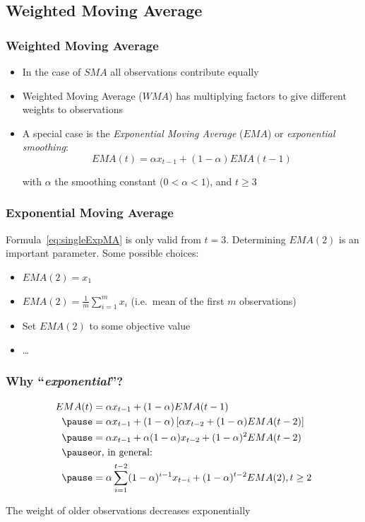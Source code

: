 \documentclass{beamer}
\begin{document}
\subsection{Weighted Moving Average}

\begin{frame}
  \frametitle{Weighted Moving Average}

  \begin{itemize}
    \item In the case of $SMA$ all observations contribute equally
    \item Weighted Moving Average ($WMA$) has multiplying factors to give different weights to observations
    \item A special case is the \emph{Exponential Moving Average} ($EMA$) or \emph{exponential smoothing}:
      \begin{equation}
        EMA(t) = \alpha x_{t-1} + (1-\alpha) EMA(t-1)
        \label{eq:singleExpMA}
      \end{equation}

      with $\alpha$ the smoothing constant ($0 < \alpha < 1$), and $t \geq 3$
  \end{itemize}
\end{frame}

\begin{frame}
  \frametitle{Exponential Moving Average}

  Formula~\ref{eq:singleExpMA} is only valid from $t=3$. Determining  $EMA(2)$ is an important parameter. Some possible choices:
  
  \begin{itemize}
    \item $EMA(2) = x_1$
    \item $EMA(2) = \frac{1}{m} \sum_{i=1}^{m} x_i$ (i.e.~mean of the first $m$ observations)
    \item Set $EMA(2)$ to some objective value
    \item \ldots
  \end{itemize}
\end{frame}

\begin{frame}
  \frametitle{Why ``\emph{exponential}''?}

  \begin{align*}
    EMA(t) & = \alpha x_{t-1} + (1-\alpha) EMA(t-1)                                           \\ \pause
           & = \alpha x_{t-1} + (1-\alpha)\left[\alpha x_{t-2} + (1-\alpha)EMA(t - 2)\right]  \\ \pause
           & = \alpha x_{t-1} + \alpha (1-\alpha)x_{t-2} + (1-\alpha)^{2} EMA(t - 2)          \\ \pause
           &   \text{or, in general:} \\ \pause
           & = \alpha \sum_{i=1}^{t-2}(1-\alpha)^{i-1}x_{t-i} + (1-\alpha)^{t-2} EMA(2), t \geq 2
  \end{align*}

  The weight of older observations decreases exponentially
\end{frame}
\end{document}
